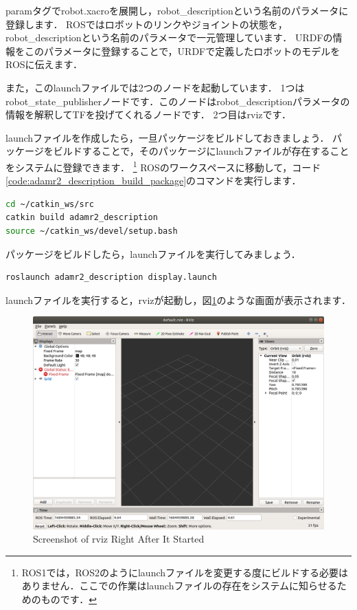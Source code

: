 \documentclass[{../../master}]{subfiles}
\begin{document}
\textsf{param}タグで\textsf{robot.xacro}を展開し，\textsf{robot\_description}という名前のパラメータに登録します．
ROSではロボットのリンクやジョイントの状態を，\textsf{robot\_description}という名前のパラメータで一元管理しています．
URDFの情報をこのパラメータに登録することで，URDFで定義したロボットのモデルをROSに伝えます．

また，このlaunchファイルでは2つのノードを起動しています．
1つは\textsf{robot\_state\_publisher}ノードです．このノードは\textsf{robot\_description}パラメータの情報を解釈してTFを投げてくれるノードです．
2つ目は\textsf{rviz}です．

launchファイルを作成したら，一旦パッケージをビルドしておきましょう．
パッケージをビルドすることで，そのパッケージにlaunchファイルが存在することをシステムに登録できます．
\footnote{ROS1では，ROS2のようにlaunchファイルを変更する度にビルドする必要はありません．ここでの作業はlaunchファイルの存在をシステムに知らせるためのものです．}
ROSのワークスペースに移動して，コード\ref{code:adamr2_description_build_package}のコマンドを実行します．

\begin{lstlisting}[language=sh, label=code:adamr2_description_build_package, caption=Build \textsf{adamr2\_description} Package]
cd ~/catkin_ws/src
catkin build adamr2_description
source ~/catkin_ws/devel/setup.bash 
\end{lstlisting}

パッケージをビルドしたら，launchファイルを実行してみましょう．

\begin{lstlisting}[language=sh, caption=Launch \textsf{display.launch}]
roslaunch adamr2_description display.launch
\end{lstlisting}

launchファイルを実行すると，\textsf{rviz}が起動し，図\ref{fig:plain_rviz}のような画面が表示されます．

\begin{figure}[ht]
  \centering
  \includegraphics[width=100truemm]{images/plain_rviz.png}
  \caption{Screenshot of \textsf{rviz} Right After It Started}
  \label{fig:plain_rviz}
\end{figure}
\end{document}
